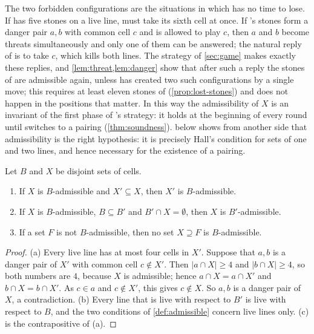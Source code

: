The two forbidden configurations are the situations in which \Breaker{} has no time to lose. If \Maker{}
has five stones on a live line, \Breaker{} must take its sixth cell at once. If \Maker's stones form a
danger pair $a,b$ with common cell $c$ and \Maker{} is allowed to play $c$, then $a$ and $b$ become
threats simultaneously and only one of them can be answered; the natural reply of \Breaker{} is to take
$c$, which kills both lines. The strategy of \cref{sec:game} makes exactly these replies, and
\cref{lem:threat,lem:danger} show that after such a reply the stones of \Maker{} are admissible again,
unless \Maker{} has created two such configurations by a single move; this requires at least eleven
stones of \Maker{} (\cref{prop:lost-stones}) and does not happen in the positions that matter. In this
way the admissibility of $X$ is an invariant of the first phase of \Breaker's strategy: it holds at the
beginning of every round until \Breaker{} switches to a pairing (\cref{thm:soundness}).
 below shows from another side that admissibility is the right hypothesis: it is precisely Hall's
condition for sets of one and two lines, and hence necessary for the existence of a pairing.

\begin{lemma}\label{lem:adm-closed}
Let $B$ and $X$ be disjoint sets of cells.
\begin{enumerate}[label=\textup{(\alph*)}]
\item If $X$ is $B$-admissible and $X'\subseteq X$, then $X'$ is $B$-admissible.
\item If $X$ is $B$-admissible, $B\subseteq B'$ and $B'\cap X=\emptyset$, then $X$ is $B'$-admissible.
\item If a set $F$ is not $B$-admissible, then no set $X\supseteq F$ is $B$-admissible.
\end{enumerate}
\end{lemma}

\begin{proof}
(a) Every live line has at most four cells in $X'$. Suppose that $a,b$ is a danger pair of $X'$ with
common cell $c\notin X'$. Then $|a\cap X|\ge 4$ and $|b\cap X|\ge 4$, so both numbers are $4$, because $X$
is admissible; hence $a\cap X=a\cap X'$ and $b\cap X=b\cap X'$. As $c\in a$ and $c\notin X'$, this gives
$c\notin X$. So $a,b$ is a danger pair of $X$, a contradiction. (b) Every line that is live with respect
to $B'$ is live with respect to $B$, and the two conditions of \cref{def:admissible} concern live lines
only. (c) is the contrapositive of (a).
\end{proof}

